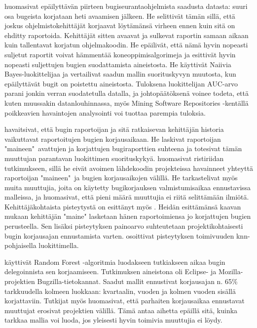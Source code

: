 \documentclass[utf8]{gradu3}
\begin{document}
\textcite{Lamkanfi-2012} huomasivat epäilyttävän piirteen bugiseurantaohjelmista
saadusta datasta: suuri osa bugeista korjataan heti avaamisen jälkeen. He
selittivät tämän sillä, että joskus ohjelmistokehittäjät korjaavat löytämänsä
virheen ennen kuin sitä on ehditty raportoida. Kehittäjät sitten avaavat ja
sulkevat raportin samaan aikaan kuin tallentavat korjatun ohjelmakoodin. He
epäilivät, että nämä hyvin nopeasti suljetut raportit voivat hämmentää
koneoppimisalgorimeja ja esittivät hyvin nopeasti suljettujen bugien
suodattamista aineistosta. %
He käyttivät Naiivia Bayes-luokittelijaa ja vertailivat saadun mallin
suorituskyvyn muutosta, kun epäilyttävät bugit on poistettu aineistosta.
Tuloksena luokittelijan AUC-arvo parani jonkin verran suodatetulla datalla, ja
johtopäätöksenä voinee todeta, että kuten muussakin datanlouhinnassa, myös
Mining Software Repositories -kentällä poikkeavien havaintojen analysointi voi
tuottaa parempia tuloksia.


\textcite{Guo-2010} havaitsivat, että bugin raportoijan ja sitä ratkaisevan
kehittäjän  historia vaikuttavat raportoitujen bugien korjausaikaan. He laskivat
raportoijan "maineen"\ avattujen ja korjattujen bugiraporttien suhteena ja
totesivat tämän muuttujan parantavan luokittimen suorituskykyä.%
\textcite{Bhattacharya-2011} huomasivat ristiriidan \parencite{Guo-2010}
tutkimukseen, sillä he eivät avoimen lähdekoodin projekteissa havainneet
yhteyttä raportoijan "maineen"\ ja bugien korjausaikojen välillä. He
tarkastelivat myös muita muuttujia, joita on käytetty bugikorjauksen
valmistumisaikaa ennustavissa malleissa, ja huomasivat, että pieni määrä
muuttujia ei riitä selittämään ilmiötä. \parencite{Bhattacharya-2011}
Kehittäjäkohtaista pisteytystä on esittänyt myös \textcite{ramarao-2016}. Heidän
esittämänsä kaavan mukaan kehittäjän "maine" lasketaan hänen raportoimiensa jo
korjattujen bugien perusteella. Sen lisäksi pisteytyksen painoarvo suhteutetaan
projektikohtaisesti bugin korjausajan ennustamista varten.
\textcite{ramarao-2016} osoittivat pisteytyksen toimivuuden knn-pohjaisella
luokittimella.

%
%

\textcite{Marks-2011} käyttivät Random Forest -algoritmia luodakseen tutkiakseen
aikaa bugin delegoinnista sen korjaamiseen. Tutkimuksen aineistona oli Eclipse-
ja Mozilla-projektien Bugzilla-tietokannat. Saadut mallit ennustivat korjausajan
n. 65\% tarkkuudella kolmeen luokkaan: kvartaalin, vuoden ja kolmen vuoden
sisällä korjattaviin. Tutkijat myös huomasivat, että parhaiten korjausaikaa
ennustavat muuttujat erosivat projektien välillä. Tämä antaa aihetta epäillä
sitä, kuinka tarkkaa mallia voi luoda, jos yleisesti hyvin toimivia muuttujia ei
löydy.
\end{document}
